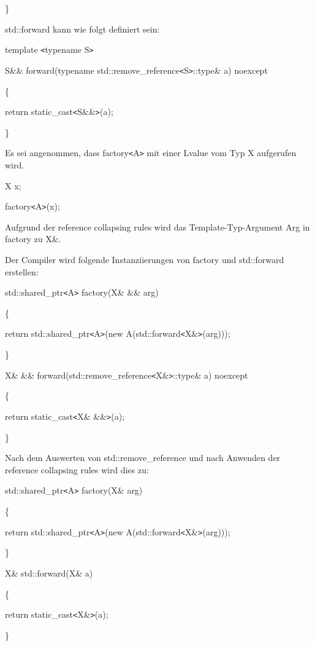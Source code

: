\documentclass{article}
\begin{document}
\parindent=0pt
\}

std::forward kann wie folgt definiert sein:

template \texttt{<}typename S\texttt{>}

S\&\& forward(typename std::remove\_reference\texttt{<}S\texttt{>}::type\& a) noexcept

\{    

\parindent=14pt
return static\_cast\texttt{<}S\&\&\texttt{>}(a);

\parindent=0pt
\}

Es sei angenommen, dass factory\texttt{<}A\texttt{>} mit einer Lvalue vom Typ X 
aufgerufen wird.

X x;

factory\texttt{<}A\texttt{>}(x);

Aufgrund der reference collapsing rules wird das Template-Typ-Argument Arg in factory 
zu X\&.

Der Compiler wird folgende Instanziierungen von factory und std::forward erstellen:

std::shared\_ptr\texttt{<}A\texttt{>} factory(X\& \&\& arg)

\{    

\parindent=14pt
return std::shared\_ptr\texttt{<}A\texttt{>}(new A(std::forward\texttt{<}X\&\texttt{>}(arg)));

\parindent=0pt
\}

X\& \&\& forward(std::remove\_reference\texttt{<}X\&\texttt{>}::type\& a) noexcept

\{    

\parindent=14pt
return static\_cast\texttt{<}X\& \&\&\texttt{>}(a);

\parindent=0pt
\}

Nach dem Auswerten von std::remove\_reference und nach Anwenden der reference collapsing 
rules wird dies zu:

std::shared\_ptr\texttt{<}A\texttt{>} factory(X\& arg)

\{    

\parindent=14pt
return std::shared\_ptr\texttt{<}A\texttt{>}(new A(std::forward\texttt{<}X\&\texttt{>}(arg)));

\parindent=0pt
\}

\vspace{25pt}
X\& std::forward(X\& a)

\{    

\parindent=14pt
return static\_cast\texttt{<}X\&\texttt{>}(a);

\parindent=0pt
\}
\end{document}
